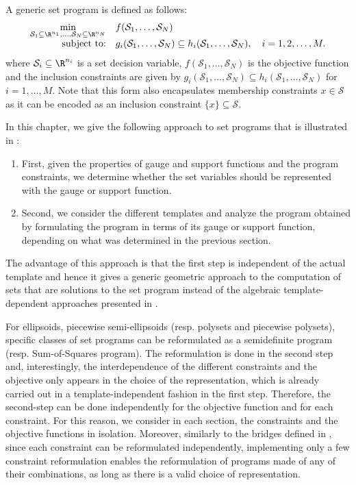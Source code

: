 \documentclass[11pt,twoside,a4paper,openright]{uclouvain-thesis}
\begin{document}
A generic set program is defined as follows:
\begin{equation}
  \label{eq:setprog}
  \begin{array}{rl}
    \min\limits_{\mathcal{S}_1 \subseteq \R^{n_1}, \ldots, \mathcal{S}_N \subseteq \R^{n_N}} & f(\mathcal{S}_1, \ldots, \mathcal{S}_N)\\
    \text{subject to:} & g_i(\mathcal{S}_1, \ldots, \mathcal{S}_N) \subseteq h_i(\mathcal{S}_1, \ldots, \mathcal{S}_N), \quad i=1,2,\ldots,M.
  \end{array}
\end{equation}
where $\mathcal{S}_i \subseteq \R^{n_i}$ is a set decision variable, %
$f(\mathcal{S}_1, \ldots, \mathcal{S}_N)$ is the objective function
and the inclusion constraints are given by $g_i(\mathcal{S}_1, \ldots, \mathcal{S}_N) \subseteq h_i(\mathcal{S}_1, \ldots, \mathcal{S}_N)$ for $i = 1, \ldots, M$.
Note that this form also encapsulates membership constraints $x \in \mathcal{S}$
as it can be encoded as an inclusion constraint $\{x\} \subseteq \mathcal{S}$.

In this chapter, we give the following approach to set programs that is illustrated in :
\begin{enumerate}
  \item First, given the properties of gauge and support functions and the program constraints,
    we determine whether the set variables should be represented with the gauge or support function.
  \item Second, we consider the different templates and analyze the program
    obtained by formulating the program in terms of its gauge or support function,
    depending on what was determined in the previous section.
\end{enumerate}
The advantage of this approach is that the first step is independent of the
actual template and hence it gives a generic geometric approach to the computation
of sets that are solutions to the set program instead of the algebraic template-dependent approaches presented in .

For ellipsoids, piecewise semi-ellipsoids (resp. polysets and piecewise polysets),
specific classes of set programs can be reformulated as a semidefinite program (resp. Sum-of-Squares program).
The reformulation is done in the second step and, interestingly,
the interdependence of the different constraints and the objective only appears in
the choice of the representation, which is already carried out in
a template-independent fashion in the first step.
Therefore, the second-step can be done independently for the objective function
and for each constraint.
For this reason, we consider in each section,
the constraints and the objective functions in isolation.
Moreover, similarly to the bridges defined in ,
since each constraint can be reformulated independently,
implementing only a few constraint reformulation enables
the reformulation of programs made of any of their combinations,
as long as there is a valid choice of representation.
\end{document}
